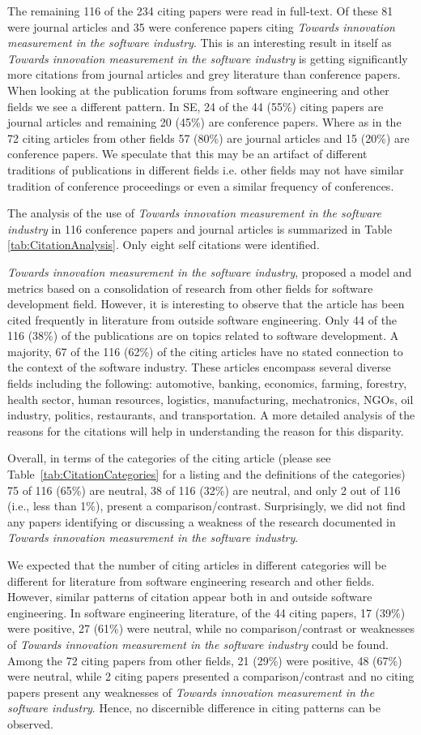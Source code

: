 \documentclass[sigconf,review]{acmart}
\newcommand{\theArticle}{\textit{Towards innovation measurement in the software industry}}
\begin{document}
The remaining 116 of the 234 citing papers were read in full-text. Of these 81 were journal articles and 35 were conference papers citing \theArticle. This is an interesting result in itself as \theArticle{} is getting significantly more citations from journal articles and grey literature than conference papers. When looking at the publication forums from software engineering and other fields we see a different pattern. In SE, 24 of the 44 (55\%) citing papers are journal articles and remaining 20 (45\%) are conference papers. Where as in the 72 citing articles from other fields 57 (80\%) are journal articles and 15 (20\%) are conference papers. We speculate that this may be an artifact of different traditions of publications in different fields i.e. other fields may not have similar tradition of conference proceedings or even a similar frequency of conferences.

The analysis of the use of \theArticle{} in 116 conference papers and journal articles is summarized in Table \ref{tab:CitationAnalysis}. Only eight self citations were identified. 

\theArticle, proposed a model and metrics based on a consolidation of research from other fields for software development field. However, it is interesting to observe that the article has been cited frequently in literature from outside software engineering. Only 44 of the 116 (38\%) of the publications are on topics related to software development. A majority, 67 of the 116 (62\%) of the citing articles have no stated connection to the context of the software industry. These articles encompass several diverse fields including the following: automotive, banking, economics, farming, forestry, health sector, human resources, logistics, manufacturing, mechatronics, NGOs, oil industry, politics, restaurants, and transportation.  A more detailed analysis of the reasons for the citations will help in understanding the reason for this disparity.

Overall, in terms of the categories of the citing article (please see Table~\ref{tab:CitationCategories} for a listing and the definitions of the categories) 75 of 116 (65\%) are neutral, 38 of 116 (32\%) are neutral, and only 2 out of 116 (i.e., less than 1\%), present a comparison\slash contrast. Surprisingly, we did not find any papers identifying or discussing a weakness of the research documented in \theArticle.
 
We expected that the number of citing articles in different categories will be different for literature from software engineering research and other fields. However, similar patterns of citation appear both in and outside software engineering. In software engineering literature, of the 44 citing papers, 17 (39\%) were positive, 27 (61\%) were neutral, while no comparison\slash contrast or weaknesses of \theArticle{} could be found. Among the 72 citing papers from other fields, 21 (29\%) were positive, 48 (67\%) were neutral, while 2 citing papers presented a comparison\slash contrast and no citing papers present any weaknesses of \theArticle. Hence, no discernible difference in citing patterns can be observed. 
\end{document}
